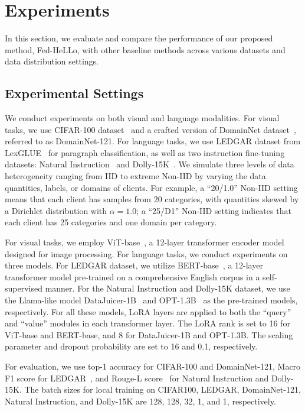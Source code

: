 \documentclass[lettersize,journal]{IEEEtran}
\begin{document}
\section{Experiments} 
In this section, we evaluate and compare the performance of our proposed method, Fed-HeLLo, with other baseline methods across various datasets and data distribution settings.

\subsection{Experimental Settings}\label{sec:exp}
We conduct experiments on both visual and language modalities. For visual tasks, we use CIFAR-100 dataset~\cite{krizhevsky2009learning} and a crafted version of DomainNet dataset~\cite{peng2019moment}, referred to as DomainNet-121. {For language tasks, we use LEDGAR dataset from LexGLUE~\cite{chalkidis-etal-2021-lexglue} for paragraph classification, as well as two instruction fine-tuning datasets: Natural Instruction~\cite{wang2022super} and Dolly-15K~\cite{ouyang2022training}.} We simulate three levels of data heterogeneity ranging from IID to extreme Non-IID by varying the data quantities, labels, or domains of clients. For example, a ``20/1.0'' Non-IID setting means that each client has samples from 20 categories, with quantities skewed by a Dirichlet distribution with $\alpha=1.0$; a ``25/D1'' Non-IID setting indicates that each client has 25 categories and one domain per category. 

For visual tasks, we employ ViT-base~\cite{dosovitskiy2020image}, a 12-layer transformer encoder model designed for image processing. {For language tasks, we conduct experiments on three models. For LEDGAR dataset, we utilize BERT-base~\cite{devlin2019bert}, a 12-layer transformer model pre-trained on a comprehensive English corpus in a self-supervised manner. For the Natural Instruction and Dolly-15K dataset, we use the Llama-like model DataJuicer-1B~\cite{chen2024data} and OPT-1.3B~\cite{zhang2022opt} as the pre-trained models, respectively. For all these models, LoRA layers are applied to both the ``query'' and ``value'' modules in each transformer layer. The LoRA rank is set to 16 for ViT-base and BERT-base, and 8 for DataJuicer-1B and OPT-1.3B. The scaling parameter and dropout probability are set to 16 and 0.1, respectively.}

{For evaluation, we use top-1 accuracy for CIFAR-100 and DomainNet-121, Macro F1 score for LEDGAR~\cite{chalkidis-etal-2021-lexglue}, and Rouge-L score~\cite{lin2004rouge} for Natural Instruction and Dolly-15K. The batch sizes for local training on CIFAR100, LEDGAR, DomainNet-121, Natural Instruction, and Dolly-15K are 128, 128, 32, 1, and 1, respectively.}
\end{document}
